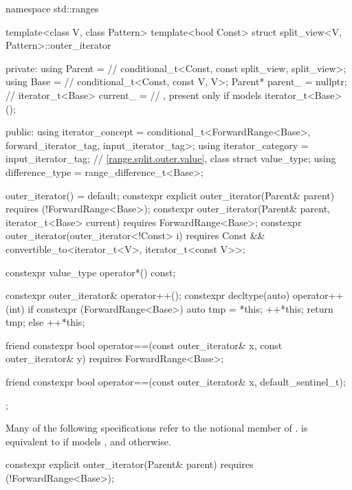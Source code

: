 \begin{codeblock}
namespace std::ranges {
  template<class V, class Pattern>
  template<bool Const>
  struct split_view<V, Pattern>::outer_iterator {
  private:
    using Parent =                              // \expos
      conditional_t<Const, const split_view, split_view>;
    using Base   =                              // \expos
      conditional_t<Const, const V, V>;
    Parent* parent_ = nullptr;                  // \expos
    iterator_t<Base> current_ =                 // \expos, present only if  models 
      iterator_t<Base>();

  public:
    using iterator_concept  =
      conditional_t<ForwardRange<Base>, forward_iterator_tag, input_iterator_tag>;
    using iterator_category = input_iterator_tag;
    // \ref{range.split.outer.value}, class 
    struct value_type;
    using difference_type   = range_difference_t<Base>;

    outer_iterator() = default;
    constexpr explicit outer_iterator(Parent& parent)
      requires (!ForwardRange<Base>);
    constexpr outer_iterator(Parent& parent, iterator_t<Base> current)
      requires ForwardRange<Base>;
    constexpr outer_iterator(outer_iterator<!Const> i)
      requires Const && convertible_to<iterator_t<V>, iterator_t<const V>>;

    constexpr value_type operator*() const;

    constexpr outer_iterator& operator++();
    constexpr decltype(auto) operator++(int) {
      if constexpr (ForwardRange<Base>) {
        auto tmp = *this;
        ++*this;
        return tmp;
      } else
        ++*this;
    }

    friend constexpr bool operator==(const outer_iterator& x, const outer_iterator& y)
      requires ForwardRange<Base>;

    friend constexpr bool operator==(const outer_iterator& x, default_sentinel_t);
  };
}
\end{codeblock}

\pnum
Many of the following specifications refer to the notional member
 of .
 is equivalent to  if 
models , and  otherwise.

%
\begin{itemdecl}
constexpr explicit outer_iterator(Parent& parent)
  requires (!ForwardRange<Base>);
\end{itemdecl}

